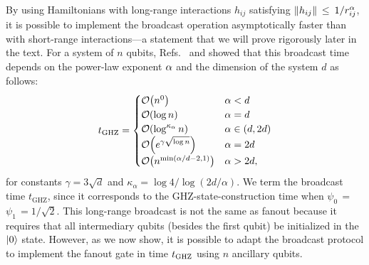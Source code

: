 By using Hamiltonians with long-range interactions $h_{ij}$ satisfying $\left\|h_{ij}\right\|$\,$\le$\,$1/r_{ij}^{\alpha}$, it is possible to implement the broadcast operation asymptotically faster than with short-range interactions---a statement that we will prove rigorously later in the text.
For a system of $n$ qubits, Refs.~\cite{Eldredge2017} and \cite{Tran2021a} showed that this broadcast time depends on the power-law exponent $\alpha$ and the dimension of the system $d$ as follows:
\begin{equation}
\label{eq:statetransfertimes_new}
	\tghz =
  \begin{cases}
    \O{n^0} & \alpha < d
    \\ \O{\log n} & \alpha = d
    \\ \O{\log^{\kappa_\alpha} n }& \alpha \in (d,2d)
    \\ \O{e^{\gamma\sqrt{\log n}}}& \al = 2d
    \\ \O{n^{\min(\al/d - 2,1)}} & \alpha > 2d,
  \end{cases}
\end{equation}
for constants $\gamma = 3\sqrt{d}$ and $\kappa_\alpha = \log 4/\log(2d/\alpha)$.
We term the broadcast time $t_{\text{GHZ}}$, since it corresponds to the GHZ-state-construction time when $\psi_0$\,$=$\,$\psi_1$\,$=1/\sqrt{2}$.
This long-range broadcast is not the same as fanout because it requires that all intermediary qubits (besides the first qubit) be initialized in the $\left | 0 \right\rangle$ state.
However, as we now show, it is possible to adapt the broadcast protocol to implement the fanout gate in time $t_{\text{GHZ}}$ using $n$ ancillary qubits.

